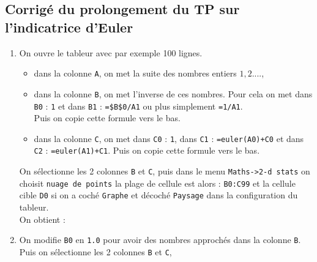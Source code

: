 \documentclass[a4paper,11pt]{book}
\begin{document}
\subsection{Corrig\'e du prolongement du {\bf TP} sur l'indicatrice d'Euler}
\begin{enumerate}
\item On ouvre le tableur avec par exemple 100 lignes.
                                  \begin{itemize}
                                  \item dans la colonne {\tt A}, on met la suite des nombres
                                    entiers $1,2....$,
                                  \item dans la colonne {\tt B}, on met l'inverse de ces nombres.
                                    Pour cela on met dans {\tt B0} : {\tt 1} et dans {\tt B1} : {\tt =\$B\$0/A1} ou 
plus simplement {\tt =1/A1}.\\
Puis on copie cette formule vers le bas.
\item dans la colonne {\tt C}, on met dans {\tt C0} :  {\tt 1}, 
dans {\tt C1} : {\tt =euler(A0)+C0} et dans {\tt C2} : {\tt =euler(A1)+C1}. 
Puis on copie cette formule vers le bas. 
\end{itemize}  
On s\'electionne les 2 colonnes {\tt B} et {\tt C}, puis dans le menu 
{\tt Maths->2-d stats} on choisit {\tt nuage de points} la plage de cellule est alors : {\tt B0:C99} et la cellule cible {\tt D0} si on a coch\'e 
{\tt Graphe} et d\'ecoch\'e {\tt Paysage} dans la configuration du tableur.\\ 
On obtient :
\begin{center}\end{center}
\item On modifie {\tt B0} en {\tt 1.0} pour avoir des nombres approch\'es dans 
la colonne {\tt B}. Puis on s\'electionne les 2 colonnes {\tt B} et {\tt C}, 

\end{enumerate}
\end{document}

